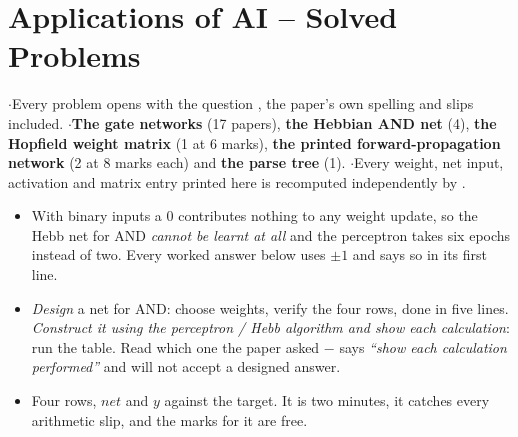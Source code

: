 \section{Applications of AI \textcolor{sub}{\large -- Solved Problems}}

{\color{sub}\footnotesize {} \gap$\cdot$\gap Every problem opens with the question
, the paper's own spelling and slips
included. \gap$\cdot$\gap \textbf{The gate networks} (17 papers), \textbf{the Hebbian
AND net} (4), \textbf{the Hopfield weight matrix} (1 at 6 marks), \textbf{the printed
forward-propagation network} (2 at 8 marks each) and \textbf{the parse tree} (1).
\gap$\cdot$\gap Every weight, net input, activation and matrix entry printed here is
recomputed independently by .}

\begin{itemize}
  \item {} With binary
        inputs a 0 contributes nothing to any weight update, so the Hebb net for AND
        \emph{cannot be learnt at all} and the perceptron takes six epochs instead of
        two. Every worked answer below uses $\pm 1$ and says so in its first line.
  \item {}
        \emph{Design} a net for AND: choose weights, verify the four rows, done in five
        lines. \emph{Construct it using the perceptron / Hebb algorithm and show each
        calculation}: run the table. Read which one the paper asked $-$
         says \emph{``show each calculation performed''} and
        will not accept a designed answer.
  \item {} Four rows,
        $net$ and $y$ against the target. It is two minutes, it catches every arithmetic
        slip, and the marks for it are free.
\end{itemize}

\hr


